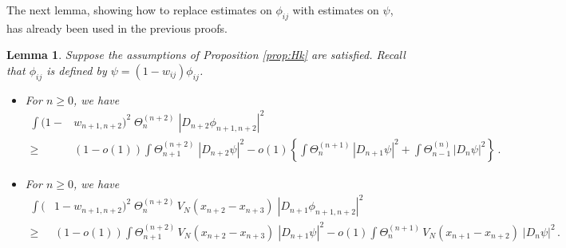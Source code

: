 \documentclass[11pt]{article}
\newtheorem{lemma}[theorem]{Lemma}
\begin{document}
The next lemma, showing how to replace estimates on $\phi_{ij}$ with
estimates on $\psi$, has already been used in the previous proofs.


\begin{lemma}\label{lm:phitopsi}
Suppose the assumptions of Proposition \ref{prop:Hk} are satisfied.
Recall that $\phi_{ij}$ is defined by $\psi = (1- w_{ij})
\phi_{ij}$.
\begin{itemize}
\item[i)] For $n\geq 0$, we have
\begin{equation}\label{eq:phitopsi1}
\begin{split}
\int (1-&w_{n+1,n+2})^2 \; \Theta^{(n+2)}_n \; |D_{n+2}
\phi_{n+1,n+2}|^2 \\ \geq \; & (1- o(1)) \int \Theta^{(n+2)}_{n+1}
\; |D_{n+2} \psi|^2 - o(1) \left\{ \int \Theta^{(n+1)}_{n} \,
|D_{n+1}\psi|^2 + \int \Theta^{(n)}_{n-1} \, |D_{n}\psi|^2
\right\}\,.
\end{split}
\end{equation}
\item[ii)] For $n \geq 0$, we have
\begin{equation}\label{eq:phitopsi2}
\begin{split}
\int (&1- w_{n+1,n+2})^2 \; \Theta^{(n+2)}_n \, V_N (x_{n+2}
-x_{n+3}) \; |D_{n+1} \phi_{n+1,n+2}|^2
\\ \geq \; & (1-o(1)) \int \Theta^{(n+2)}_{n+1} \, V_N
(x_{n+2} -x_{n+3}) \; |D_{n+1} \psi|^2 -o(1)\int \Theta^{(n+1)}_{n}
\, V_N (x_{n+1} -x_{n+2}) \; |D_{n} \psi|^2\,.
\end{split}
\end{equation}
\end{itemize}
\end{lemma}
\end{document}
